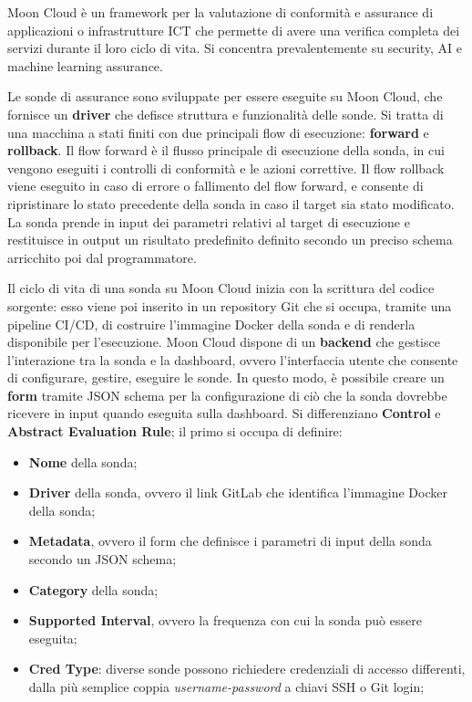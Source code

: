 Moon Cloud \cite{8647247} è un framework per la valutazione di conformità e assurance di applicazioni o infrastrutture ICT che permette di avere una verifica completa dei servizi durante il loro ciclo di vita. Si concentra prevalentemente su security, AI e machine learning assurance.

Le sonde di assurance sono sviluppate per essere eseguite su Moon Cloud, che fornisce un \textbf{driver} che defisce struttura e funzionalità delle sonde. Si tratta di una macchina a stati finiti con due principali flow di esecuzione: \textbf{forward} e \textbf{rollback}. Il flow forward è il flusso principale di esecuzione della sonda, in cui vengono eseguiti i controlli di conformità e le azioni correttive. Il flow rollback viene eseguito in caso di errore o fallimento del flow forward, e consente di ripristinare lo stato precedente della sonda in caso il target sia stato modificato. La sonda prende in input dei parametri relativi al target di esecuzione e restituisce in output un risultato predefinito definito secondo un preciso schema arricchito poi dal programmatore.

Il ciclo di vita di una sonda su Moon Cloud inizia con la scrittura del codice sorgente: esso viene poi inserito in un repository Git che si occupa, tramite una pipeline CI/CD, di costruire l'immagine Docker della sonda e di renderla disponibile per l'esecuzione. Moon Cloud dispone di un \textbf{backend} che gestisce l'interazione tra la sonda e la dashboard, ovvero l'interfaccia utente che consente di configurare, gestire, eseguire le sonde. In questo modo, è possibile creare un \textbf{form} tramite JSON schema per la configurazione di ciò che la sonda dovrebbe ricevere in input quando eseguita sulla dashboard. Si differenziano \textbf{Control} e \textbf{Abstract Evaluation Rule};
il primo si occupa di definire:

\begin{itemize}
    \item \textbf{Nome} della sonda;
    \item \textbf{Driver} della sonda, ovvero il link GitLab che identifica l'immagine Docker della sonda;
    \item \textbf{Metadata}, ovvero il form che definisce i parametri di input della sonda secondo un JSON schema;
    \item \textbf{Category} della sonda;
    \item \textbf{Supported Interval}, ovvero la frequenza con cui la sonda può essere eseguita;
    \item \textbf{Cred Type}: diverse sonde possono richiedere credenziali di accesso differenti, dalla più semplice coppia \textit{username-password} a chiavi SSH o Git login;
\end{itemize}

